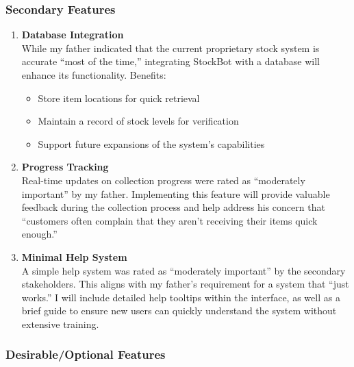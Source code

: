 \subsubsection{Secondary Features}

\begin{enumerate}
    \item \textbf{Database Integration}\\
    While my father indicated that the current proprietary stock system is accurate ``most of the time,'' integrating StockBot with a database will enhance its functionality. Benefits:
    \begin{itemize}
        \item Store item locations for quick retrieval
        \item Maintain a record of stock levels for verification
        \item Support future expansions of the system's capabilities
    \end{itemize}
    
    \item \textbf{Progress Tracking}\\
    Real-time updates on collection progress were rated as ``moderately important'' by my father. Implementing this feature will provide valuable feedback during the collection process and help address his concern that ``customers often complain that they aren't receiving their items quick enough.''
    
    \item \textbf{Minimal Help System}\\
    A simple help system was rated as ``moderately important'' by the secondary stakeholders. This aligns with my father's requirement for a system that ``just works.'' I will include detailed help tooltips within the interface, as well as a brief guide to ensure new users can quickly understand the system without extensive training.
\end{enumerate}

\subsubsection{Desirable/Optional Features}

